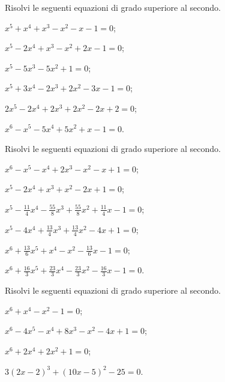 \begin{esercizio}[\Ast] %
Risolvi le seguenti equazioni di grado superiore al secondo.
\begin{multicols}{2}
\begin{enumeratea}
\item $x^5+x^4+x^3-x^2-x-1=0$;
\item $x^5-2x^4+x^3-x^2+2x-1=0$;
\item $x^5-5x^3-5x^2+1=0$;
\item $x^5+3x^4-2x^3+2x^2-3x-1=0$;
\item $2x^5-2x^4+2x^3+2x^2-2x+2=0$;
\item $x^6-x^5-5x^4+5x^2+x-1=0$.
\end{enumeratea}
\end{multicols}
\end{esercizio}
\pagebreak
\begin{esercizio}[\Ast] %
Risolvi le seguenti equazioni di grado superiore al secondo.
\begin{multicols}{2}
\begin{enumeratea}
\item $x^6-x^5-x^4+2x^3-x^2-x+1=0$;
\item $x^5-2x^4+x^3+x^2-2x+1=0$;
\item $x^5-\frac{11} 4x^4-\frac{55} 8x^3+\frac{55} 8x^2+\frac{11} 4x-1=0$;
\item $x^5-4x^4+\frac{13} 4x^3+\frac{13} 4x^2-4x+1=0$;
\item $x^6+\frac{13} 6x^5+x^4-x^2-\frac{13} 6x-1=0$;
\item $x^6+\frac{16} 3x^5+\frac{23} 3x^4-\frac{23} 3x^2-\frac{16} 3x-1=0$.
\end{enumeratea}
\end{multicols}
\end{esercizio}

\begin{esercizio}[\Ast] %
Risolvi le seguenti equazioni di grado superiore al secondo.
\begin{multicols}{2}
\begin{enumeratea}
\item $x^6+x^4-x^2-1=0$;
\item $x^6-4x^5-x^4+8x^3-x^2-4x+1=0$;
\item $x^6+2x^4+2x^2+1=0$;
\item $3(2x-2)^3+(10x-5)^2-25=0$.
\end{enumeratea}
\end{multicols}
\end{esercizio}

